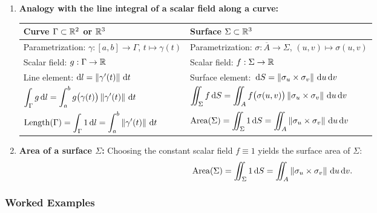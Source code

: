 \begin{remarque}
\begin{enumerate}[label=\textbf{\alph*)}]
    \item \textbf{Analogy with the line integral of a scalar field along a curve:}
    \begin{center}
    \renewcommand{\arraystretch}{1.35}
    \begin{tabular}{@{}ll@{}}
        \toprule
        \textbf{Curve $\Gamma \subset \mathbb{R}^2$ or $\mathbb{R}^3$} & \textbf{Surface $\Sigma \subset \mathbb{R}^3$} \\
        \midrule
        Parametrization: $\gamma : [a,b] \to \Gamma$, $t \mapsto \gamma(t)$ & Parametrization: $\sigma : \overline{A} \to \Sigma$, $(u,v) \mapsto \sigma(u,v)$ \\
        Scalar field: $g : \Gamma \to \mathbb{R}$ & Scalar field: $f : \Sigma \to \mathbb{R}$ \\
        Line element: $\mathrm{d} l = \left\lVert\gamma'(t)\right\rVert \,\mathrm{d}t$ & Surface element: $\,\mathrm{d}S = \left\lVert\sigma_u \times \sigma_v\right\rVert \,\mathrm{d} u\,\mathrm{d} v$ \\
        $\displaystyle \int_{\Gamma} g \,\mathrm{d} l = \int_{a}^{b} g\big(\gamma(t)\big) \left\lVert\gamma'(t)\right\rVert \,\mathrm{d}t$ & $\displaystyle \iint_{\Sigma} f \,\mathrm{d}S = \iint_{A} f\big(\sigma(u,v)\big) \left\lVert\sigma_u \times \sigma_v\right\rVert \,\mathrm{d} u\,\mathrm{d} v$ \\
        $\displaystyle \operatorname{Length}(\Gamma) = \int_{\Gamma} 1 \,\mathrm{d} l = \int_{a}^{b} \left\lVert\gamma'(t)\right\rVert \,\mathrm{d}t$ & $\displaystyle \operatorname{Area}(\Sigma) = \iint_{\Sigma} 1 \,\mathrm{d}S = \iint_{A} \left\lVert\sigma_u \times \sigma_v\right\rVert \,\mathrm{d} u\,\mathrm{d} v$ \\
        \bottomrule
    \end{tabular}
    \end{center}
    \item \textbf{Area of a surface $\Sigma$:} Choosing the constant scalar field $f \equiv 1$ yields the surface area of $\Sigma$:
    \[
        \operatorname{Area}(\Sigma) = \iint_{\Sigma} 1 \,\mathrm{d}S = \iint_{A} \left\lVert\sigma_u \times \sigma_v\right\rVert \,\mathrm{d} u\,\mathrm{d} v.
    \]
\end{enumerate}
\end{remarque}

\subsubsection{Worked Examples}

